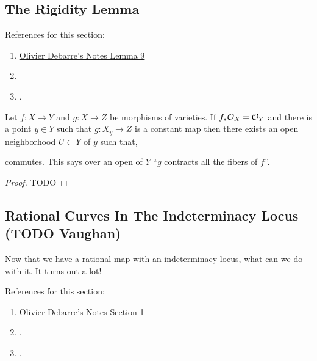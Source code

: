\documentclass[12pt]{article}
\begin{document}
\subsection{The Rigidity Lemma}

\begin{rmk}
References for this section:
\begin{enumerate}
\item \href{https://www.math.ens.psl.eu/~debarre/Grenoble.pdf}{Olivier Debarre's Notes Lemma 9}
\item \cite[section 1.1, Corollary 1.7 and Lemma 1.9]{birational_geometry}
\item \cite[Section II.5, Lemma 1.6]{rational_curves}.
\end{enumerate}
\end{rmk}


\begin{lemma}
Let $f : X \to Y$ and $g : X \to Z$ be morphisms of varieties. If $f_* \mathcal{O}_{X} = \mathcal{O}_{Y}$ and there is a point $y \in Y$ such that $g : X_y \to Z$ is a constant map then there exists an open neighborhood $U \subset Y$ of $y$ such that,
\begin{center}
\end{center}
commutes. This says over an open of $Y$ ``$g$ contracts all the fibers of $f$''.
\end{lemma}

\begin{proof}
TODO
\end{proof}


\subsection{Rational Curves In The Indeterminacy Locus (TODO Vaughan)}

\begin{rmk}
Now that we have a rational map with an indeterminacy locus, what can we do with it. It turns out a lot!
\end{rmk}

\begin{rmk}
References for this section:
\begin{enumerate}
\item \href{https://www.math.ens.psl.eu/~debarre/Grenoble.pdf}{Olivier Debarre's Notes Section 1}
\item \cite[section 1.1, p.8-9]{birational_geometry}.
\item \cite[section VI.1]{rational_curves}.
\end{enumerate}
\end{rmk}
\end{document}
